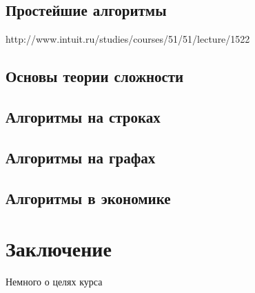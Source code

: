 \documentclass[b5paper,11pt]{book}
\begin{document}
	\section{Простейшие алгоритмы}
		http://www.intuit.ru/studies/courses/51/51/lecture/1522
	\section{Основы теории сложности}
	\section{Алгоритмы на строках}
	\section{Алгоритмы на графах}
	\section{Алгоритмы в экономике}
	
	
	\chapter*{Заключение}
	Немного о целях курса
	\printbibliography
\end{document}

